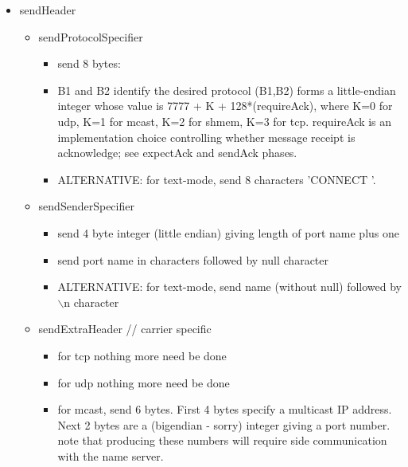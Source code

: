 \begin{itemize}

\item sendHeader
    
  \begin{itemize}

    \item sendProtocolSpecifier

      \begin{itemize}

      \item send 8 bytes: 
      \item B1 and B2 identify the desired protocol
      (B1,B2) forms a little-endian integer whose value is
         7777 + K + 128*(requireAck),
      where K=0 for udp, K=1 for mcast, K=2 for shmem, K=3 for tcp.
      requireAck is an implementation choice controlling
      whether message receipt is acknowledge; see expectAck and sendAck
      phases.
    
      \item ALTERNATIVE: for text-mode, send 8 characters 'CONNECT '.
	
      \end{itemize}

    \item sendSenderSpecifier
      
      \begin{itemize}
      \item send 4 byte integer (little endian) giving length of port
      name plus one
      \item send port name in characters followed by null character
      \item ALTERNATIVE: for text-mode, send name (without null)
      followed by $\backslash$n character
      \end{itemize}

    \item sendExtraHeader      // carrier specific
      \begin{itemize}
	\item for tcp nothing more need be done
	\item for udp nothing more need be done
	\item for mcast, send 6 bytes.
         First 4 bytes specify a multicast IP address.
	 Next 2 bytes are a (bigendian - sorry) integer giving a port number.
         note that producing these numbers will require side communication
         with the name server.
      \end{itemize}
  \end{itemize}


\end{itemize}
